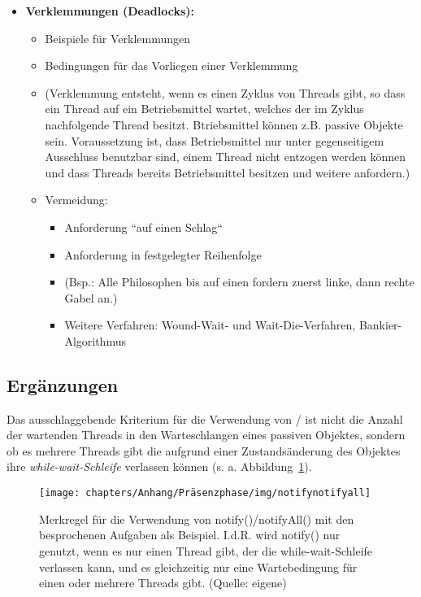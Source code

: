 \begin{itemize}
        \item \textbf{Verklemmungen (Deadlocks):}
        \begin{itemize}
            \item Beispiele für Verklemmungen
            \item Bedingungen für das Vorliegen einer Verklemmung
            \item[] (Verklemmung entsteht, wenn es einen Zyklus von Threads gibt, so dass ein Thread auf ein Betriebsmittel wartet, welches der im Zyklus nachfolgende Thread besitzt. Btriebsmittel können z.B. passive Objekte sein. Voraussetzung ist, dass Betriebsmittel nur unter gegenseitigem Ausschluss benutzbar sind, einem Thread nicht entzogen werden können und dass Threads bereits Betriebsmittel besitzen und weitere anfordern.)
            \item Vermeidung:
            \begin{itemize}
                \item Anforderung ``auf einen Schlag``
                \item Anforderung in festgelegter Reihenfolge
                \item[] (Bsp.: Alle Philosophen bis auf einen fordern zuerst linke, dann rechte Gabel an.)
                \item Weitere Verfahren: Wound-Wait- und Wait-Die-Verfahren, Bankier-Algorithmus
            \end{itemize}
        \end{itemize}

    \end{itemize}

\subsection{Ergänzungen}
\begin{tcolorbox}
    Das ausschlaggebende Kriterium für die Verwendung von  /  ist nicht die Anzahl der wartenden Threads in den Warteschlangen eines passiven Objektes, sondern ob es mehrere Threads gibt die aufgrund einer Zustandsänderung des Objektes ihre \textit{while-wait-Schleife} verlassen können (s. a. Abbildung~\ref{fig:notifynotifyall}).
\end{tcolorbox}

\begin{figure}
    \centering
    \texttt{[image: chapters/Anhang/Präsenzphase/img/notifynotifyall]}
    \caption{Merkregel für die Verwendung von notify()/notifyAll() mit den besprochenen Aufgaben als Beispiel. I.d.R. wird notify() nur genutzt, wenn es nur einen Thread gibt, der die while-wait-Schleife verlassen kann, und es gleichzeitig nur eine Wartebedingung für einen oder mehrere Threads gibt. (Quelle: eigene)}
    \label{fig:notifynotifyall}
\end{figure}


